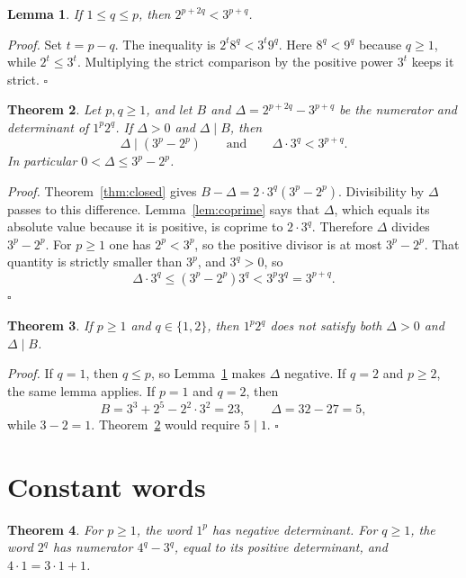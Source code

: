 \documentclass[11pt,letterpaper]{article}
\newtheorem{theorem}{Theorem}
\newtheorem{lemma}[theorem]{Lemma}
\newenvironment{proof}{\noindent\textit{Proof.}}{\hfill\(\square\)}
\begin{document}
\begin{lemma}
\label{lem:negative}
If \(1\le q\le p\), then \(2^{p+2q}<3^{p+q}\).
\end{lemma}

\begin{proof}
Set \(t=p-q\). The inequality is \(2^t8^q<3^t9^q\). Here \(8^q<9^q\) because \(q\ge 1\), while \(2^t\le 3^t\). Multiplying the strict comparison by the positive power \(3^t\) keeps it strict.
\end{proof}

\begin{theorem}
\label{thm:gap}
Let \(p,q\ge 1\), and let \(B\) and \(\Delta=2^{p+2q}-3^{p+q}\) be the numerator and determinant of \(1^p2^q\). If \(\Delta>0\) and \(\Delta\mid B\), then
\[
\Delta\mid(3^p-2^p)
\qquad\text{and}\qquad
\Delta\cdot 3^q<3^{p+q}.
\]
In particular \(0<\Delta\le 3^p-2^p\).
\end{theorem}

\begin{proof}
Theorem~\ref{thm:closed} gives \(B-\Delta=2\cdot 3^q(3^p-2^p)\). Divisibility by \(\Delta\) passes to this difference. Lemma~\ref{lem:coprime} says that \(\Delta\), which equals its absolute value because it is positive, is coprime to \(2\cdot 3^q\). Therefore \(\Delta\) divides \(3^p-2^p\). For \(p\ge 1\) one has \(2^p<3^p\), so the positive divisor is at most \(3^p-2^p\). That quantity is strictly smaller than \(3^p\), and \(3^q>0\), so
\[
\Delta\cdot 3^q\le(3^p-2^p)3^q<3^p3^q=3^{p+q}.
\]
\end{proof}

\begin{theorem}
\label{thm:small}
If \(p\ge 1\) and \(q\in\{1,2\}\), then \(1^p2^q\) does not satisfy both \(\Delta>0\) and \(\Delta\mid B\).
\end{theorem}

\begin{proof}
If \(q=1\), then \(q\le p\), so Lemma~\ref{lem:negative} makes \(\Delta\) negative. If \(q=2\) and \(p\ge 2\), the same lemma applies. If \(p=1\) and \(q=2\), then
\[
B=3^3+2^5-2^2\cdot 3^2=23,\qquad \Delta=32-27=5,
\]
while \(3-2=1\). Theorem~\ref{thm:gap} would require \(5\mid 1\).
\end{proof}

\section{Constant words}

\begin{theorem}
\label{thm:constants}
For \(p\ge 1\), the word \(1^p\) has negative determinant. For \(q\ge 1\), the word \(2^q\) has numerator \(4^q-3^q\), equal to its positive determinant, and \(4\cdot 1=3\cdot 1+1\).
\end{theorem}
\end{document}
